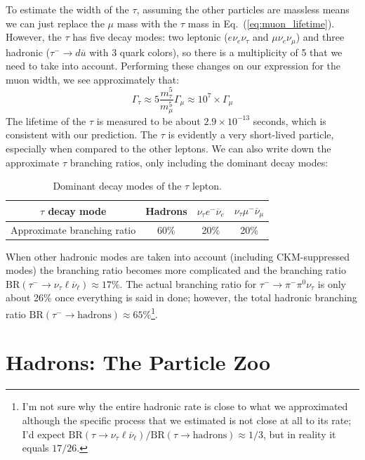 \documentclass[11pt, oneside]{article}   	%
\theoremstyle{definition}
\numberwithin{equation}{subsection}		%
\begin{document}
To estimate the width of the $\tau$, assuming the other particles are massless means we can just replace the $\mu$ mass with the $\tau$ mass in Eq.~(\ref{eq:muon_lifetime}). 
However, the $\tau$ has five decay modes: two leptonic ($e\nu_e\nu_\tau$ and $\mu\nu_e\nu_\mu$) and three hadronic ($\tau^-\rightarrow d\overline u$ with 3 quark colors), 
so there is a multiplicity of 5 that we need to take into account. Performing these changes on our expression for the muon width, we see approximately that:
\begin{equation}
	\Gamma_\tau\approx 5\frac{m_\tau^5}{m_\mu^5}\Gamma_\mu \approx 10^{7}\times \Gamma_\mu
\end{equation}
The lifetime of the $\tau$ is measured to be about $2.9\times 10^{-13}$ seconds, which is consistent with our prediction. The $\tau$ is evidently a very short-lived particle, 
especially when compared to the other leptons. We can also write down the approximate $\tau$ branching ratios, only including the dominant decay modes:
\begin{table}[H]
	\centering
	\begin{tabular}{ | c | c | c | c |}
		\hline
		$\tau$ decay mode & Hadrons & $\nu_\tau e^-\overline\nu_e$ & $\nu_\tau\mu^-\overline\nu_\mu$ \\
		\hline
		Approximate branching ratio & 60\% & 20\% & 20\% \\
		\hline
	\end{tabular}
	\caption{Dominant decay modes of the $\tau$ lepton.}
	\label{table:tau_decay}
\end{table}
When other hadronic modes are taken into account (including CKM-suppressed modes) the branching ratio becomes more complicated and the branching ratio $\mathrm{BR}(\tau^-
\rightarrow\nu_\tau\ell\overline\nu_\ell)\approx 17\%$. The actual branching ratio for $\tau^-\rightarrow\pi^-\pi^0\nu_\tau$ is only about 26\% once everything is said in done; however, 
the total hadronic branching ratio $\mathrm{BR}(\tau^-\rightarrow\mathrm{hadrons})\approx 65\%$\footnote{I'm not sure why the entire 
hadronic rate is close to what we approximated although the specific process that we estimated is not close at all to its rate; I'd expect 
$\mathrm{BR}(\tau\rightarrow\nu_\tau\ell\overline\nu_\ell) / \mathrm{BR}(\tau\rightarrow\mathrm{hadrons})\approx 1 / 3$, but in reality it 
equals $17 / 26$.}.

\newpage
\section{Hadrons: The Particle Zoo}
\end{document}
